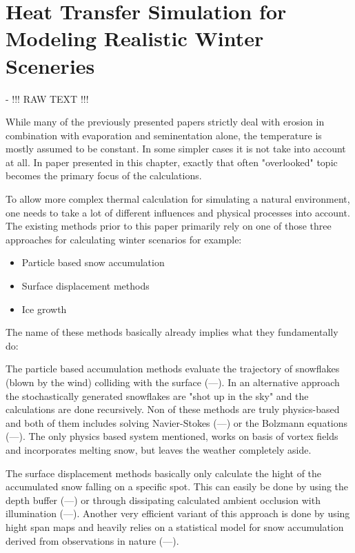 \section{Heat Transfer Simulation for Modeling Realistic Winter Sceneries}

\cite{benes2001layered} - !!! RAW TEXT !!!

While many of the previously presented papers strictly deal with erosion in combination with evaporation and seminentation alone, the temperature is mostly assumed to be constant. In some simpler cases it is not take into account at all. In paper presented in this chapter, exactly that often "overlooked" topic becomes the primary focus of the calculations.

To allow more complex thermal calculation for simulating a natural environment, one needs to take a lot of different influences and physical processes into account. The existing methods prior to this paper primarily rely on one of those three approaches for calculating winter scenarios for example:
\begin{itemize}
	\item Particle based snow accumulation
	\item Surface displacement methods
	\item Ice growth
\end{itemize}

The name of these methods basically already implies what they fundamentally do:

The particle based accumulation methods evaluate the trajectory of snowflakes (blown by the wind) colliding with the surface (---). In an alternative approach the stochastically generated snowflakes are "shot up in the sky" and the calculations are done recursively. Non of these methods are truly physics-based and both of them includes solving Navier-Stokes (---) or the Bolzmann equations (---). The only physics based system mentioned, works on basis of vortex fields and incorporates melting snow, but leaves the weather completely aside.

The surface displacement methods basically only calculate the hight of the accumulated snow falling on a specific spot. This can easily be done by using the depth buffer (---) or through dissipating calculated ambient occlusion with illumination (---). Another very efficient variant of this approach is done by using hight span maps and heavily relies on a statistical model for snow accumulation derived from observations in nature (---).

